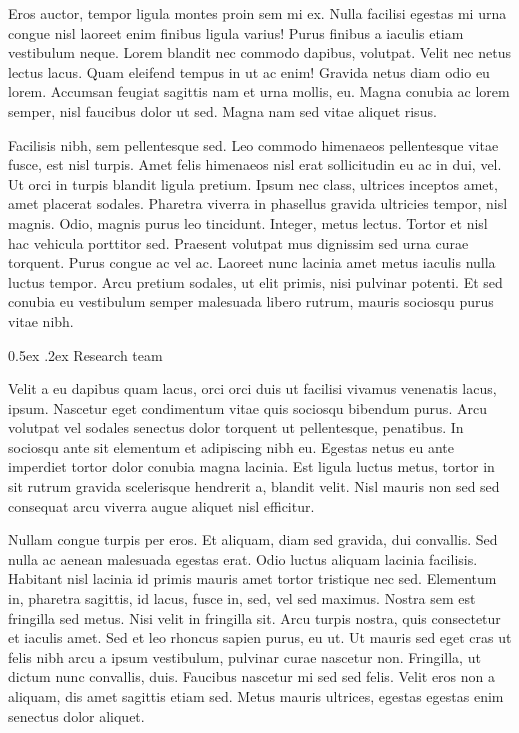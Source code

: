 \documentclass[11pt,]{article}
\makeatletter
\renewcommand\subsubsection{
  \@startsection{subsubsection}{3}{\z@}
    {-1.0ex\@plus -1ex \@minus -.2ex}%
    {0.5ex \@plus .2ex}%
    {\normalfont\normalsize\bf}} %
\makeatother
\begin{document}
Eros auctor, tempor ligula montes proin sem mi ex. Nulla facilisi
egestas mi urna congue nisl laoreet enim finibus ligula varius! Purus
finibus a iaculis etiam vestibulum neque. Lorem blandit nec commodo
dapibus, volutpat. Velit nec netus lectus lacus. Quam eleifend tempus in
ut ac enim! Gravida netus diam odio eu lorem. Accumsan feugiat sagittis
nam et urna mollis, eu. Magna conubia ac lorem semper, nisl faucibus
dolor ut sed. Magna nam sed vitae aliquet risus.

Facilisis nibh, sem pellentesque sed. Leo commodo himenaeos pellentesque
vitae fusce, est nisl turpis. Amet felis himenaeos nisl erat
sollicitudin eu ac in dui, vel. Ut orci in turpis blandit ligula
pretium. Ipsum nec class, ultrices inceptos amet, amet placerat sodales.
Pharetra viverra in phasellus gravida ultricies tempor, nisl magnis.
Odio, magnis purus leo tincidunt. Integer, metus lectus. Tortor et nisl
hac vehicula porttitor sed. Praesent volutpat mus dignissim sed urna
curae torquent. Purus congue ac vel ac. Laoreet nunc lacinia amet metus
iaculis nulla luctus tempor. Arcu pretium sodales, ut elit primis, nisi
pulvinar potenti. Et sed conubia eu vestibulum semper malesuada libero
rutrum, mauris sociosqu purus vitae nibh.

\hypertarget{research-team}{%
\subsubsection{Research team}\label{research-team}}

Velit a eu dapibus quam lacus, orci orci duis ut facilisi vivamus
venenatis lacus, ipsum. Nascetur eget condimentum vitae quis sociosqu
bibendum purus. Arcu volutpat vel sodales senectus dolor torquent ut
pellentesque, penatibus. In sociosqu ante sit elementum et adipiscing
nibh eu. Egestas netus eu ante imperdiet tortor dolor conubia magna
lacinia. Est ligula luctus metus, tortor in sit rutrum gravida
scelerisque hendrerit a, blandit velit. Nisl mauris non sed sed
consequat arcu viverra augue aliquet nisl efficitur.

Nullam congue turpis per eros. Et aliquam, diam sed gravida, dui
convallis. Sed nulla ac aenean malesuada egestas erat. Odio luctus
aliquam lacinia facilisis. Habitant nisl lacinia id primis mauris amet
tortor tristique nec sed. Elementum in, pharetra sagittis, id lacus,
fusce in, sed, vel sed maximus. Nostra sem est fringilla sed metus. Nisi
velit in fringilla sit. Arcu turpis nostra, quis consectetur et iaculis
amet. Sed et leo rhoncus sapien purus, eu ut. Ut mauris sed eget cras ut
felis nibh arcu a ipsum vestibulum, pulvinar curae nascetur non.
Fringilla, ut dictum nunc convallis, duis. Faucibus nascetur mi sed sed
felis. Velit eros non a aliquam, dis amet sagittis etiam sed. Metus
mauris ultrices, egestas egestas enim senectus dolor aliquet.
\end{document}
